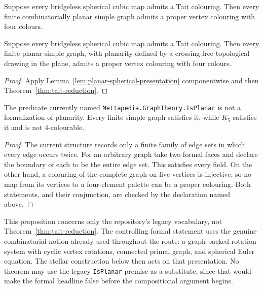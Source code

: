 \begin{theorem}
\label{thm:tait-reduction}
Suppose every bridgeless spherical cubic map admits a Tait colouring. Then
every finite combinatorially planar simple graph admits a proper vertex
colouring with four colours.
\end{theorem}

\begin{corollary}
\label{cor:tait-reduction-topological}
Suppose every bridgeless spherical cubic map admits a Tait colouring. Then
every finite planar simple graph, with planarity defined by a crossing-free
topological drawing in the plane, admits a proper vertex colouring with four
colours.
\end{corollary}

\begin{proof}
Apply Lemma~\ref{lem:planar-spherical-presentation} componentwise and then
Theorem~\ref{thm:tait-reduction}.
\end{proof}

\begin{proposition}
\label{prop:weak-planarity-refuted}
The predicate currently named \texttt{Mettapedia.GraphTheory.IsPlanar} is not
a formalization of planarity.  Every finite simple graph satisfies it, while
$K_5$ satisfies it and is not $4$-colourable.
\end{proposition}

\begin{proof}
The current structure records only a finite family of edge sets in which
every edge occurs twice.  For an arbitrary graph take two formal faces and
declare the boundary of each to be the entire edge set.  This satisfies every
field.  On the other hand, a colouring of the complete graph on five vertices
is injective, so no map from its vertices to a four-element palette can be a
proper colouring.  Both statements, and their conjunction, are checked by
the declaration named above.
\end{proof}

This proposition concerns only the repository's legacy vocabulary, not
Theorem~\ref{thm:tait-reduction}.  The controlling formal statement uses
the genuine combinatorial notion already used throughout the route: a
graph-backed rotation system with cyclic vertex rotations, connected primal
graph, and spherical Euler equation.  The stellar construction below then
acts on that presentation.  No theorem may use the legacy
\texttt{IsPlanar} premise as a substitute, since that would make the formal
headline false before the compositional argument begins.


